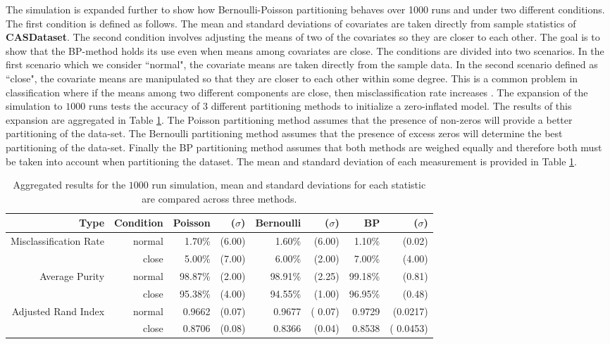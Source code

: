 \documentclass[11pt,letterpaper]{article}
\numberwithin{equation}{section}
\numberwithin{equation}{section}
\numberwithin{equation}{section}
\begin{document}
The simulation is expanded further to show how Bernoulli-Poisson partitioning behaves over 1000 runs and under two different conditions. The first condition is defined as follows. The mean and standard deviations of covariates are taken directly from sample statistics of \textbf{CASDataset}. The second condition involves adjusting the means of two of the covariates so they are closer to each other. The goal is to show that the BP-method holds its use even when means among covariates are close. The conditions are divided into two scenarios. In the first scenario which we consider ``normal", the covariate means are taken directly from the sample data. In the second scenario defined as ``close", the covariate means are manipulated so that they are closer to each other within some degree. This is a common problem in classification where if the means among two different components are close, then misclassification rate increases \citep{LimHwa}. The expansion of the simulation to $1000$ runs tests the accuracy of 3 different partitioning methods to initialize a zero-inflated model. The results of this expansion are aggregated in Table \ref{table:exper2}.  The Poisson partitioning method assumes that the presence of non-zeros will provide a better partitioning of the data-set. The Bernoulli partitioning method assumes that the presence of excess zeros will determine the best partitioning of the data-set. Finally the BP partitioning method assumes that both methods are weighed equally and therefore both must be taken into account when partitioning the dataset. The mean and standard deviation of each measurement is provided in Table \ref{table:exper2}.

\begin{table}[!htb]
\begin{center}
\caption{Aggregated results for the $1000$ run simulation, mean and standard deviations for each statistic are compared across three methods.}
\label{table:exper2}
\begin{tabular}{rrrrrrrr}
\hline\hline
Type   & Condition & Poisson & ($\sigma $) & Bernoulli & ($ \sigma $) & BP & ($ \sigma $) \\
\hline
Misclassification Rate& normal        & 1.70\% & (6.00)       & 1.60\%  & (6.00)         & 1.10\% & (0.02)         \\
       & close      & 5.00\% & (7.00)       & 6.00\% & (2.00)         & 7.00\% & (4.00)         \\
Average Purity & normal     & 98.87\% & (2.00)    & 98.91\% & (2.25)      & 99.18\% & (0.81)     \\
       & close       & 95.38\% & (4.00)    & 94.55\% & (1.00)      & 96.95\% & (0.48)      \\
Adjusted Rand Index  & normal      & 0.9662 & (0.07)    & 0.9677  & ( 0.07)     & 0.9729 & (0.0217)      \\
       & close         & 0.8706 & (0.08)    & 0.8366 & (0.04)      & 0.8538 & ( 0.0453) \\
       \hline\hline
\end{tabular}
\end{center}
\end{table}
\end{document}

